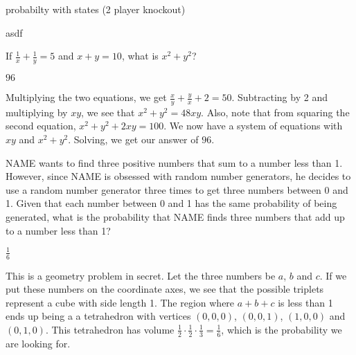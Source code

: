 \documentclass[11pt]{article}
\begin{document}
\begin{problem}
probabilty with states (2 player knockout)
\end{problem}

\begin{answer}

\end{answer}

\begin{solution}
asdf
\end{solution}


\begin{problem}%
If $\frac{1}{x} + \frac{1}{y} = 5$ and $x+y=10$, what is $x^2+y^2$?
\end{problem}

\begin{answer}
$\boxed{96}$
\end{answer}

\begin{solution}
Multiplying the two equations, we get $\frac{x}{y} + \frac{y}{x} + 2 = 50$. Subtracting by 2 and multiplying by $xy$, we see that $x^2+y^2 = 48xy$. Also, note that from squaring the second equation, $x^2+ y^2 +2xy = 100$. We now have a system of equations with $xy$ and $x^2+y^2$. Solving, we get our answer of $\boxed{96}$.
\end{solution}


\begin{problem} %
NAME wants to find three positive numbers that sum to a number less than 1. However, since NAME is obsessed with random number generators, he decides to use a random number generator three times to get three numbers between 0 and 1. Given that each number between 0 and 1 has the same probability of being generated, what is the probability that NAME finds three numbers that add up to a number less than 1?
\end{problem}

\begin{answer}
$\frac{1}{6}$
\end{answer}

\begin{solution}
This is a geometry problem in secret. Let the three numbers be $a$, $b$ and $c$. If we put these numbers on the coordinate axes, we see that the possible triplets represent a cube with side length 1. The region where $a + b + c$ is less than 1 ends up being a a tetrahedron with vertices $(0, 0, 0)$, $(0, 0, 1)$, $(1, 0, 0)$ and $(0, 1, 0)$. This tetrahedron has volume $\frac{1}{2} \cdot \frac{1}{2} \cdot \frac{1}{3} = \frac{1}{6}$, which is the probability we are looking for.
\end{solution}
\end{document}
